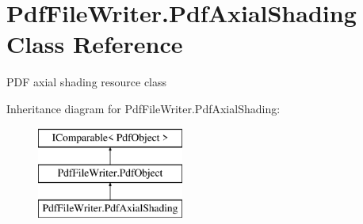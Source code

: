 \hypertarget{class_pdf_file_writer_1_1_pdf_axial_shading}{}\section{Pdf\+File\+Writer.\+Pdf\+Axial\+Shading Class Reference}
\label{class_pdf_file_writer_1_1_pdf_axial_shading}


P\+DF axial shading resource class  


Inheritance diagram for Pdf\+File\+Writer.\+Pdf\+Axial\+Shading\+:\begin{figure}[H]
\begin{center}
\leavevmode
\includegraphics[height=3.000000cm]{class_pdf_file_writer_1_1_pdf_axial_shading}
\end{center}
\end{figure}
